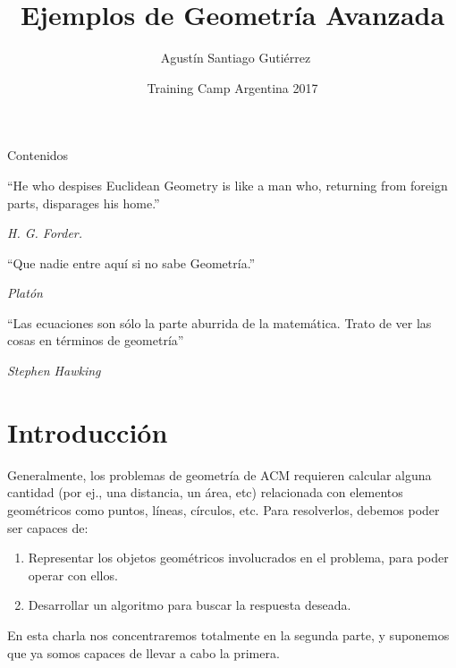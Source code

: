 \documentclass[compress]{beamer}
\title[Geometr\'ia Avanzada] %
{Ejemplos de Geometría Avanzada}
\author[Agustín Gutiérrez] %
{~Agustín Santiago Gutiérrez}
\institute[UBA] %
{
  Facultad de Ciencias Exactas y Naturales\\
  Universidad de Buenos Aires
}
\date[TC Arg 2017] %
{Training Camp Argentina 2017}
\begin{document}
\begin{frame}
  \titlepage
\end{frame}

\begin{frame}{Contenidos}
  \tableofcontents
\end{frame}

\begin{frame}

``He who despises Euclidean Geometry is like a man who, returning from foreign parts, disparages his home.''

\hfill \textit{H. G. Forder.}

\vfill

``Que nadie entre aquí si no sabe Geometría.''

\hfill \textit{Platón}

\vfill

``Las ecuaciones son sólo la parte aburrida de la matemática. Trato de ver las cosas en términos de geometría''

\hfill \textit{Stephen Hawking}

\end{frame}

\section{Introducci\'on}
\begin{frame}

Generalmente, los problemas de geometr\'ia de ACM requieren calcular 
alguna cantidad (por ej., una distancia, un \'area, etc) relacionada con
elementos geom\'etricos como puntos, l\'ineas, c\'irculos, etc.
Para resolverlos, debemos poder ser capaces de:\\
\bigskip
\begin{enumerate}
\item Representar los objetos geom\'etricos involucrados en el problema, 
para poder operar con ellos.

\item Desarrollar un algoritmo para buscar la respuesta deseada.
\end{enumerate}

En esta charla nos concentraremos totalmente en la segunda parte, y suponemos que ya somos capaces de llevar a cabo la primera.

\end{frame}
\end{document}
